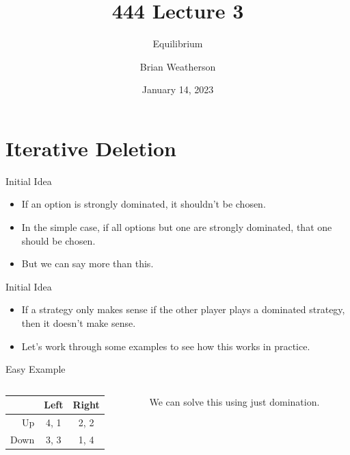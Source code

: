 \documentclass[
  14pt,
  letterpaper,
  ignorenonframetext,
  aspectratio=169,
  handout]{beamer}
\title{444 Lecture 3}
\subtitle{Equilibrium}
\author{Brian Weatherson}
\date{January 14, 2023}
\providecommand{\tightlist}{%
  \setlength{\itemsep}{0pt}\setlength{\parskip}{0pt}}\usepackage{longtable,booktabs,array}
\let\olditem\item
\renewcommand{\item}{%
\olditem\vspace{6pt}}
\begin{document}
\frame{\titlepage}
\ifdefined\Shaded\renewenvironment{Shaded}{\begin{tcolorbox}[interior hidden, breakable, enhanced, boxrule=0pt, sharp corners, borderline west={3pt}{0pt}{shadecolor}, frame hidden]}{\end{tcolorbox}}\fi

\hypertarget{iterative-deletion}{%
\section{Iterative Deletion}\label{iterative-deletion}}

\begin{frame}{Initial Idea}
\protect\hypertarget{initial-idea}{}
\begin{itemize}[<+->]
\tightlist
\item
  If an option is strongly dominated, it shouldn't be chosen.
\item
  In the simple case, if all options but one are strongly dominated,
  that one should be chosen.
\item
  But we can say more than this.
\end{itemize}
\end{frame}

\begin{frame}{Initial Idea}
\protect\hypertarget{initial-idea-1}{}
\begin{itemize}[<+->]
\tightlist
\item
  If a strategy only makes sense if the other player plays a dominated
  strategy, then it doesn't make sense.
\item
  Let's work through some examples to see how this works in practice.
\end{itemize}
\end{frame}

\begin{frame}{Easy Example}
\protect\hypertarget{easy-example}{}
\begin{columns}[T]
\begin{column}{0.4\textwidth}
\begin{table}[!h]
\centering
\begin{tabular}[t]{>{}r|cc}
\toprule
 & Left & Right\\
\midrule
Up & 4, 1 & 2, 2\\
Down & 3, 3 & 1, 4\\
\bottomrule
\end{tabular}
\end{table}
\end{column}

\begin{column}{0.6\textwidth}
We can solve this using just domination.
\end{column}
\end{columns}
\end{frame}
\end{document}
